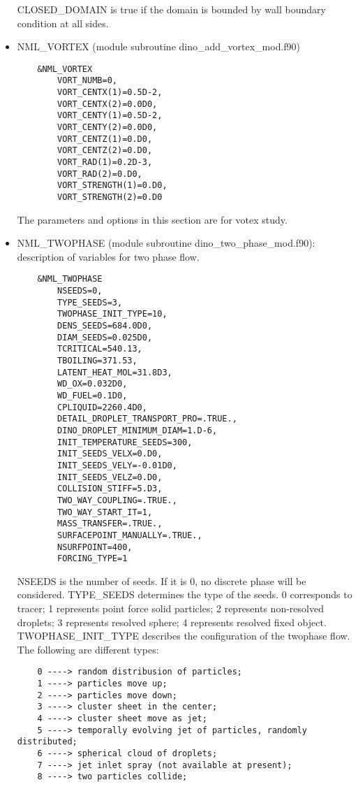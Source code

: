 \begin{itemize}
\begin{lstlisting}
  \end{lstlisting}
  CLOSED\_DOMAIN is true if the domain is bounded by wall boundary condition at all sides.
  \item NML\_VORTEX (module subroutine dino\_add\_vortex\_mod.f90)
  \begin{lstlisting}
    &NML_VORTEX
        VORT_NUMB=0,
        VORT_CENTX(1)=0.5D-2,
        VORT_CENTX(2)=0.0D0,
        VORT_CENTY(1)=0.5D-2,
        VORT_CENTY(2)=0.0D0,
        VORT_CENTZ(1)=0.D0,
        VORT_CENTZ(2)=0.D0,
        VORT_RAD(1)=0.2D-3,
        VORT_RAD(2)=0.D0,
        VORT_STRENGTH(1)=0.D0,
        VORT_STRENGTH(2)=0.D0
  \end{lstlisting}
  The parameters and options in this section are for votex study.
  \item NML\_TWOPHASE (module subroutine dino\_two\_phase\_mod.f90): description of variables for two phase flow.
  \begin{lstlisting}
    &NML_TWOPHASE
        NSEEDS=0,
        TYPE_SEEDS=3,
        TWOPHASE_INIT_TYPE=10,
        DENS_SEEDS=684.0D0,
        DIAM_SEEDS=0.025D0,
        TCRITICAL=540.13,
        TBOILING=371.53,
        LATENT_HEAT_MOL=31.8D3,
        WD_OX=0.032D0,
        WD_FUEL=0.1D0,
        CPLIQUID=2260.4D0,
        DETAIL_DROPLET_TRANSPORT_PRO=.TRUE.,
        DINO_DROPLET_MINIMUM_DIAM=1.D-6,
        INIT_TEMPERATURE_SEEDS=300,
        INIT_SEEDS_VELX=0.D0,
        INIT_SEEDS_VELY=-0.01D0,
        INIT_SEEDS_VELZ=0.D0,
        COLLISION_STIFF=5.D3,
        TWO_WAY_COUPLING=.TRUE.,
        TWO_WAY_START_IT=1,
        MASS_TRANSFER=.TRUE.,
        SURFACEPOINT_MANUALLY=.TRUE.,
        NSURFPOINT=400,
        FORCING_TYPE=1
  \end{lstlisting}
  NSEEDS is the number of seeds. If it is 0, no discrete phase will be considered. TYPE\_SEEDS determines the type of the seeds. 0 corresponds to tracer; 1 represents point force solid particles; 2 represents non-resolved droplets; 3 represents resolved sphere; 4 represents resolved fixed object.
  TWOPHASE\_INIT\_TYPE describes the configuration of the twophase flow. The following are different types:
  \begin{lstlisting}
    0 ----> random distribusion of particles;
    1 ----> particles move up;
    2 ----> particles move down;
    3 ----> cluster sheet in the center;
    4 ----> cluster sheet move as jet;
    5 ----> temporally evolving jet of particles, randomly distributed;
    6 ----> spherical cloud of droplets;
    7 ----> jet inlet spray (not available at present);
    8 ----> two particles collide;

\end{lstlisting}
\end{itemize}
